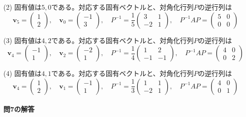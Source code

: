 (2) 固有値は$5, 0$である。対応する固有ベクトルと、対角化行列$P$の逆行列は
\[
\bm{v}_5 = 
\begin{pmatrix}
1 \\
2
\end{pmatrix}, \quad
\bm{v}_{0} = 
\begin{pmatrix}
-1 \\
3
\end{pmatrix}, \quad
P^{-1} = 
\frac{1}{5}
\begin{pmatrix}
3 & 1 \\
-2 & 1
\end{pmatrix}, \quad
P^{-1} AP =
\begin{pmatrix}
5 & 0 \\
0 & 0
\end{pmatrix}
\]

(3) 固有値は$4, 2$である。対応する固有ベクトルと、対角化行列$P$の逆行列は
\[
\bm{v}_4 = 
\begin{pmatrix}
-1 \\
1
\end{pmatrix}, \quad
\bm{v}_2 = 
\begin{pmatrix}
-2 \\
1
\end{pmatrix}, \quad
P^{-1} = 
\frac{1}{4}
\begin{pmatrix}
1 & 2 \\
-1 & -1
\end{pmatrix}, \quad
P^{-1} AP =
\begin{pmatrix}
4 & 0 \\
0 & 2
\end{pmatrix}
\]

(4) 固有値は$4, 1$である。対応する固有ベクトルと、対角化行列$P$の逆行列は
\[
\bm{v}_4 = 
\begin{pmatrix}
1 \\
2
\end{pmatrix}, \quad
\bm{v}_1 = 
\begin{pmatrix}
-1 \\
1
\end{pmatrix}, \quad
P^{-1} = 
\frac{1}{3}
\begin{pmatrix}
1 & 1 \\
-2 & 1
\end{pmatrix}, \quad
P^{-1} AP =
\begin{pmatrix}
4 & 0 \\
0 & 1
\end{pmatrix}
\]

\paragraph{問7の解答}

